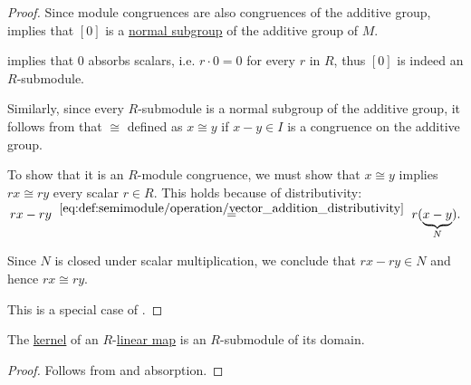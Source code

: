 \begin{proof}
   Since module congruences are also congruences of the additive group,  implies that \( [0] \) is a \hyperref[def:normal_subgroup]{normal subgroup} of the additive group of \( M \).

   implies that \( 0 \) absorbs scalars, i.e. \( r \cdot 0 = 0 \) for every \( r \) in \( R \), thus \( [0] \) is indeed an \( R \)-submodule.

   Similarly, since every \( R \)-submodule is a normal subgroup of the additive group, it follows from  that \( {\cong} \) defined as \( x \cong y \) if \( x - y \in I \) is a congruence on the additive group.

  To show that it is an \( R \)-module congruence, we must show that \( x \cong y \) implies \( rx \cong ry \) every scalar \( r \in R \). This holds because of distributivity:
  \begin{equation*}
    rx - ry
    \reloset {\eqref{eq:def:semimodule/operation/vector_addition_distributivity}} =
    r(\underbrace{x - y}_{N}).
  \end{equation*}

  Since \( N \) is closed under scalar multiplication, we conclude that \( rx - ry \in N \) and hence \( rx \cong ry \).

   This is a special case of .
\end{proof}

\begin{proposition}\label{thm:kernel_is_submodule}
  The \hyperref[def:module/kernel]{kernel} of an \( R \)-\hyperref[def:module/homomorphism]{linear map} is an \( R \)-submodule of its domain.
\end{proposition}
\begin{proof}
  Follows from  and absorption.
\end{proof}

